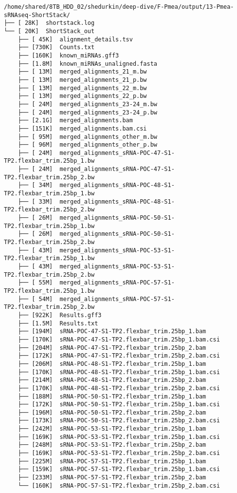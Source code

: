 \documentclass[
]{article}
\newenvironment{Shaded}{\begin{snugshade}}{\end{snugshade}}
\newcommand{\AttributeTok}[1]{\textcolor[rgb]{0.77,0.63,0.00}{#1}}
\newcommand{\BuiltInTok}[1]{#1}
\newcommand{\CommentTok}[1]{\textcolor[rgb]{0.56,0.35,0.01}{\textit{#1}}}
\newcommand{\ExtensionTok}[1]{#1}
\newcommand{\NormalTok}[1]{#1}
\newcommand{\VariableTok}[1]{\textcolor[rgb]{0.00,0.00,0.00}{#1}}
\begin{document}
\begin{Shaded}
\end{Shaded}

\begin{verbatim}
/home/shared/8TB_HDD_02/shedurkin/deep-dive/F-Pmea/output/13-Pmea-sRNAseq-ShortStack/
├── [ 28K]  shortstack.log
└── [ 20K]  ShortStack_out
    ├── [ 45K]  alignment_details.tsv
    ├── [730K]  Counts.txt
    ├── [160K]  known_miRNAs.gff3
    ├── [1.8M]  known_miRNAs_unaligned.fasta
    ├── [ 13M]  merged_alignments_21_m.bw
    ├── [ 13M]  merged_alignments_21_p.bw
    ├── [ 13M]  merged_alignments_22_m.bw
    ├── [ 13M]  merged_alignments_22_p.bw
    ├── [ 24M]  merged_alignments_23-24_m.bw
    ├── [ 24M]  merged_alignments_23-24_p.bw
    ├── [2.1G]  merged_alignments.bam
    ├── [151K]  merged_alignments.bam.csi
    ├── [ 95M]  merged_alignments_other_m.bw
    ├── [ 96M]  merged_alignments_other_p.bw
    ├── [ 24M]  merged_alignments_sRNA-POC-47-S1-TP2.flexbar_trim.25bp_1.bw
    ├── [ 24M]  merged_alignments_sRNA-POC-47-S1-TP2.flexbar_trim.25bp_2.bw
    ├── [ 34M]  merged_alignments_sRNA-POC-48-S1-TP2.flexbar_trim.25bp_1.bw
    ├── [ 33M]  merged_alignments_sRNA-POC-48-S1-TP2.flexbar_trim.25bp_2.bw
    ├── [ 26M]  merged_alignments_sRNA-POC-50-S1-TP2.flexbar_trim.25bp_1.bw
    ├── [ 26M]  merged_alignments_sRNA-POC-50-S1-TP2.flexbar_trim.25bp_2.bw
    ├── [ 43M]  merged_alignments_sRNA-POC-53-S1-TP2.flexbar_trim.25bp_1.bw
    ├── [ 43M]  merged_alignments_sRNA-POC-53-S1-TP2.flexbar_trim.25bp_2.bw
    ├── [ 55M]  merged_alignments_sRNA-POC-57-S1-TP2.flexbar_trim.25bp_1.bw
    ├── [ 54M]  merged_alignments_sRNA-POC-57-S1-TP2.flexbar_trim.25bp_2.bw
    ├── [922K]  Results.gff3
    ├── [1.5M]  Results.txt
    ├── [194M]  sRNA-POC-47-S1-TP2.flexbar_trim.25bp_1.bam
    ├── [170K]  sRNA-POC-47-S1-TP2.flexbar_trim.25bp_1.bam.csi
    ├── [204M]  sRNA-POC-47-S1-TP2.flexbar_trim.25bp_2.bam
    ├── [172K]  sRNA-POC-47-S1-TP2.flexbar_trim.25bp_2.bam.csi
    ├── [206M]  sRNA-POC-48-S1-TP2.flexbar_trim.25bp_1.bam
    ├── [170K]  sRNA-POC-48-S1-TP2.flexbar_trim.25bp_1.bam.csi
    ├── [214M]  sRNA-POC-48-S1-TP2.flexbar_trim.25bp_2.bam
    ├── [170K]  sRNA-POC-48-S1-TP2.flexbar_trim.25bp_2.bam.csi
    ├── [188M]  sRNA-POC-50-S1-TP2.flexbar_trim.25bp_1.bam
    ├── [172K]  sRNA-POC-50-S1-TP2.flexbar_trim.25bp_1.bam.csi
    ├── [196M]  sRNA-POC-50-S1-TP2.flexbar_trim.25bp_2.bam
    ├── [173K]  sRNA-POC-50-S1-TP2.flexbar_trim.25bp_2.bam.csi
    ├── [242M]  sRNA-POC-53-S1-TP2.flexbar_trim.25bp_1.bam
    ├── [169K]  sRNA-POC-53-S1-TP2.flexbar_trim.25bp_1.bam.csi
    ├── [248M]  sRNA-POC-53-S1-TP2.flexbar_trim.25bp_2.bam
    ├── [169K]  sRNA-POC-53-S1-TP2.flexbar_trim.25bp_2.bam.csi
    ├── [225M]  sRNA-POC-57-S1-TP2.flexbar_trim.25bp_1.bam
    ├── [159K]  sRNA-POC-57-S1-TP2.flexbar_trim.25bp_1.bam.csi
    ├── [233M]  sRNA-POC-57-S1-TP2.flexbar_trim.25bp_2.bam
    └── [160K]  sRNA-POC-57-S1-TP2.flexbar_trim.25bp_2.bam.csi


\end{verbatim}
\end{document}

